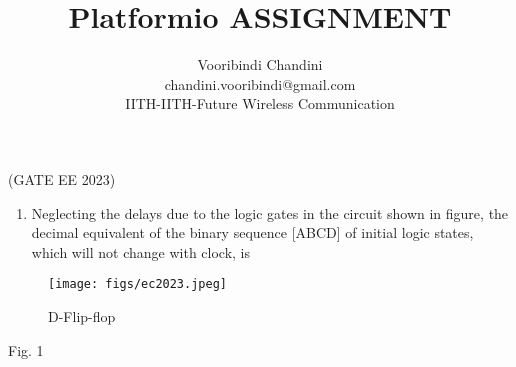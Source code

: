 
\def\mytitle{Platformio ASSIGNMENT }
\def\myauthor{Vooribindi Chandini}
\def\mycontact{chandini.vooribindi@gmail.com}
\def\mymodule{IITH-Future Wireless Communication}

\usepackage{graphicx} 
\usepackage{enumitem}
\usepackage{tikz}
\usepackage{circuitikz}
\usepackage{karnaugh-map}
\usepackage{tabularx}
\title{\mytitle}
\author{\myauthor\\\mycontact\\IITH\hspace{0.3em}-\hspace{0.3em}\mymodule}

\maketitle

\hfill(GATE EE 2023)
\begin{enumerate}
    \item  Neglecting the delays due to the logic gates in the circuit shown in figure, the 
decimal equivalent of the binary sequence [ABCD] of initial logic states, which 
will not change with clock, is 

\end{enumerate}
 \begin{figure}[H]
        \centering
        \texttt{[image: figs/ec2023.jpeg]}
        \caption{D-Flip-flop}
        \label{ec2023.jpeg}
    \end{figure}  
    
\begin{center}
Fig. 1 
\end{center}


